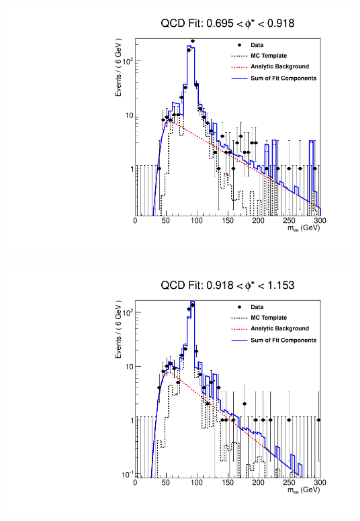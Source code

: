 \begin{figure}[!htbp]
    \centering
    \begin{subfigure}[b]{\SideBySidePlotWidth}
        \includegraphics[width=\linewidth]{figures/qcd_fits/qcd_fit_plot_for_29.pdf}
        \label{fig:qcd_fit_29}
    \end{subfigure}%
    \begin{subfigure}[b]{\SideBySidePlotWidth}
        \includegraphics[width=\linewidth]{figures/qcd_fits/qcd_fit_plot_for_30.pdf}
        \label{fig:qcd_fit_30}
    \end{subfigure}
    \begin{subfigure}[b]{\SideBySidePlotWidth}

\end{subfigure}
\end{figure}
